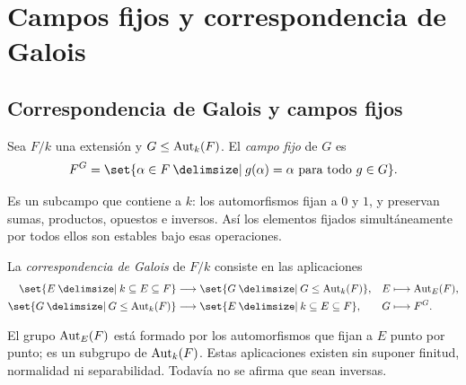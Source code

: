 \section{Campos fijos y correspondencia de Galois}\label{sec:campos-fijos}

\subsection{Correspondencia de Galois y campos fijos}\label{tema:26-3-1}\label{tema:26-3-2}
\begin{defi}
Sea $F/k$ una extensión y $G\leq\operatorname{Aut}_k(F)$. El \emph{campo fijo} de $G$ es
\[
F^G=\set{\alpha\in F\given g(\alpha)=\alpha\text{ para todo }g\in G}.
\]
\end{defi}
Es un subcampo que contiene a $k$: los automorfismos fijan a $0$ y $1$, y preservan sumas, productos, opuestos e inversos. Así los elementos fijados simultáneamente por todos ellos son estables bajo esas operaciones.

\begin{defi}
La \emph{correspondencia de Galois} de $F/k$ consiste en las aplicaciones
\[
\begin{aligned}
\set{E\given k\subseteq E\subseteq F}&\longrightarrow
\set{G\given G\leq\Aut_k(F)},& E&\longmapsto\Aut_E(F),\\
\set{G\given G\leq\Aut_k(F)}&\longrightarrow
\set{E\given k\subseteq E\subseteq F},& G&\longmapsto F^G.
\end{aligned}
\]
\end{defi}
El grupo $\operatorname{Aut}_E(F)$ está formado por los automorfismos que fijan a $E$ punto por punto; es un subgrupo de $\operatorname{Aut}_k(F)$. Estas aplicaciones existen sin suponer finitud, normalidad ni separabilidad. Todavía no se afirma que sean inversas.

